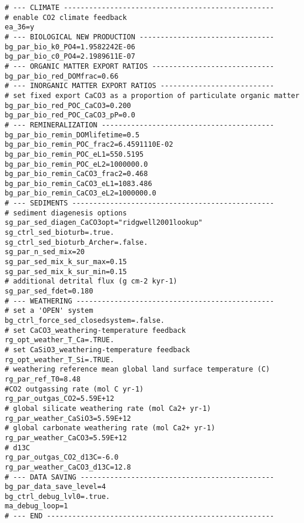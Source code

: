 \documentclass[11pt,fleqn]{book} %
\begin{document}
\scriptsize\begin{verbatim}
# --- CLIMATE --------------------------------------------------
# enable CO2 climate feedback
ea_36=y
# --- BIOLOGICAL NEW PRODUCTION --------------------------------
bg_par_bio_k0_PO4=1.9582242E-06
bg_par_bio_c0_PO4=2.1989611E-07
# --- ORGANIC MATTER EXPORT RATIOS -----------------------------
bg_par_bio_red_DOMfrac=0.66
# --- INORGANIC MATTER EXPORT RATIOS ---------------------------
# set fixed export CaCO3 as a proportion of particulate organic matter 
bg_par_bio_red_POC_CaCO3=0.200
bg_par_bio_red_POC_CaCO3_pP=0.0
# --- REMINERALIZATION -----------------------------------------
bg_par_bio_remin_DOMlifetime=0.5
bg_par_bio_remin_POC_frac2=6.4591110E-02
bg_par_bio_remin_POC_eL1=550.5195
bg_par_bio_remin_POC_eL2=1000000.0
bg_par_bio_remin_CaCO3_frac2=0.468
bg_par_bio_remin_CaCO3_eL1=1083.486
bg_par_bio_remin_CaCO3_eL2=1000000.0
# --- SEDIMENTS ------------------------------------------------
# sediment diagenesis options
sg_par_sed_diagen_CaCO3opt="ridgwell2001lookup"
sg_ctrl_sed_bioturb=.true.
sg_ctrl_sed_bioturb_Archer=.false.
sg_par_n_sed_mix=20
sg_par_sed_mix_k_sur_max=0.15
sg_par_sed_mix_k_sur_min=0.15
# additional detrital flux (g cm-2 kyr-1)
sg_par_sed_fdet=0.180
# --- WEATHERING -----------------------------------------------
# set a 'OPEN' system
bg_ctrl_force_sed_closedsystem=.false.
# set CaCO3_weathering-temperature feedback
rg_opt_weather_T_Ca=.TRUE.
# set CaSiO3_weathering-temperature feedback
rg_opt_weather_T_Si=.TRUE.
# weathering reference mean global land surface temperature (C)
rg_par_ref_T0=8.48
#CO2 outgassing rate (mol C yr-1)
rg_par_outgas_CO2=5.59E+12
# global silicate weathering rate (mol Ca2+ yr-1)
rg_par_weather_CaSiO3=5.59E+12
# global carbonate weathering rate (mol Ca2+ yr-1)
rg_par_weather_CaCO3=5.59E+12
# d13C
rg_par_outgas_CO2_d13C=-6.0
rg_par_weather_CaCO3_d13C=12.8
# --- DATA SAVING ----------------------------------------------
bg_par_data_save_level=4
bg_ctrl_debug_lvl0=.true.
ma_debug_loop=1
# --- END ------------------------------------------------------
\end{verbatim}\normalsize
\end{document}
